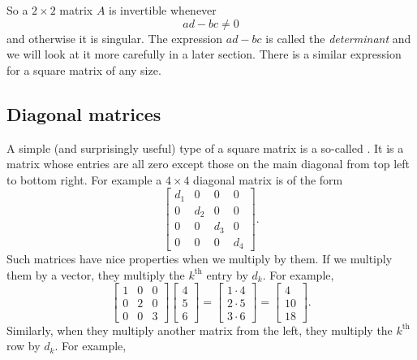 So a $2 \times 2$ matrix $A$ is invertible whenever
\begin{equation*}
ad - bc \not= 0
\end{equation*}
and otherwise it is singular.  The expression $ad-bc$ is called
the \emph{determinant} and we will look at it 
more carefully in a later section.
There is a similar expression for a square
matrix of any size.

\subsection{Diagonal matrices}

A simple (and surprisingly useful) type of a square matrix is a so-called
\emph{}.  It is a matrix whose entries are all zero
except those on the main diagonal from top left to bottom right.  For
example a $4 \times 4$ diagonal matrix is of the form
\begin{equation*}
\begin{bmatrix}
d_1 & 0 & 0 & 0 \\
0 & d_2 & 0 & 0 \\
0 & 0 & d_3 & 0 \\
0 & 0 & 0 & d_4
\end{bmatrix} .
\end{equation*}
Such matrices have nice properties when we multiply by them.  If we multiply
them by a vector, they multiply the $k^{\text{th}}$ entry by $d_k$.  For
example,
\begin{equation*}
\begin{bmatrix}
1 & 0 & 0 \\
0 & 2 & 0 \\
0 & 0 & 3
\end{bmatrix}
\begin{bmatrix}
4 \\ 5 \\ 6
\end{bmatrix}
=
\begin{bmatrix}
1 \cdot 4 \\ 2 \cdot 5 \\ 3 \cdot 6
\end{bmatrix}
=
\begin{bmatrix}
4 \\ 10 \\ 18
\end{bmatrix} .
\end{equation*}
Similarly, when they multiply another matrix from the left, they multiply
the $k^{\text{th}}$ row by $d_k$.  For example,
